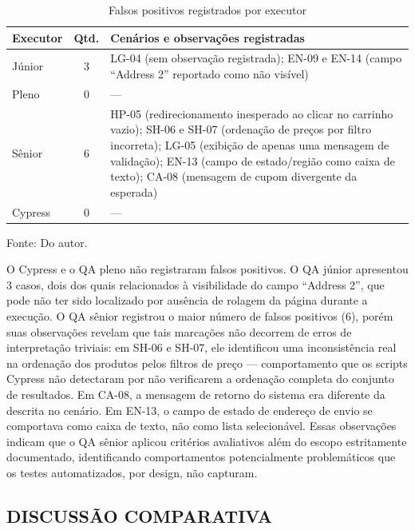 \documentclass{UNESC}
\begin{document}
\begin{table}[H]
\captionsetup{skip=2pt, singlelinecheck=false, justification=centering}
\caption{Falsos positivos registrados por executor}
\label{tab:falsos_positivos}
\renewcommand{\arraystretch}{1.0}
\setlength{\extrarowheight}{4pt}
\setlength{\tabcolsep}{6pt}
\begin{tabularx}{\textwidth}{l c X}
\hline
\textbf{Executor} & \textbf{Qtd.} & \textbf{Cenários e observações registradas} \\
\hline
Júnior  & 3 & LG-04 (sem observação registrada); EN-09 e EN-14 (campo ``Address 2'' reportado como não visível) \\
Pleno   & 0 & --- \\
Sênior  & 6 & HP-05 (redirecionamento inesperado ao clicar no carrinho vazio); SH-06 e SH-07 (ordenação de preços por filtro incorreta); LG-05 (exibição de apenas uma mensagem de validação); EN-13 (campo de estado/região como caixa de texto); CA-08 (mensagem de cupom divergente da esperada) \\
Cypress & 0 & --- \\
\hline
\end{tabularx}
\vspace{2mm}\par
\noindent Fonte: Do autor.
\end{table}

O Cypress e o QA pleno não registraram falsos positivos. O QA júnior apresentou 3 casos, dois dos quais relacionados à visibilidade do campo ``Address 2'', que pode não ter sido localizado por ausência de rolagem da página durante a execução. O QA sênior registrou o maior número de falsos positivos (6), porém suas observações revelam que tais marcações não decorrem de erros de interpretação triviais: em SH-06 e SH-07, ele identificou uma inconsistência real na ordenação dos produtos pelos filtros de preço — comportamento que os scripts Cypress não detectaram por não verificarem a ordenação completa do conjunto de resultados. Em CA-08, a mensagem de retorno do sistema era diferente da descrita no cenário. Em EN-13, o campo de estado de endereço de envio se comportava como caixa de texto, não como lista selecionável. Essas observações indicam que o QA sênior aplicou critérios avaliativos além do escopo estritamente documentado, identificando comportamentos potencialmente problemáticos que os testes automatizados, por design, não capturam.

\subsection{DISCUSSÃO COMPARATIVA}
\end{document}
